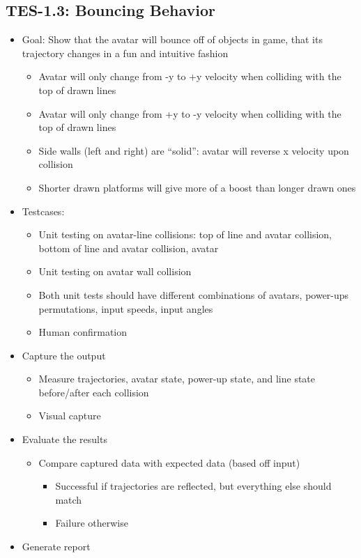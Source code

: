 \subsection{TES-1.3: Bouncing Behavior }
\label{bounce}
\begin{itemize}
\item Goal: Show that the avatar will bounce off of objects in game, that its trajectory changes in a fun and intuitive fashion 

\begin{itemize}
\item Avatar will only change from -y to +y velocity when colliding with the top of drawn lines 
\item Avatar will only change from +y to -y velocity when colliding with the top of drawn lines
\item Side walls (left and right) are \textquotedblleft{}solid\textquotedblright{}: avatar will reverse x velocity upon collision
\item Shorter drawn platforms will give more of a boost than longer drawn ones
\end{itemize}

\item Testcases: 
\begin{itemize}
\item Unit testing on avatar-line collisions: top of line and avatar collision, bottom of line and avatar collision, avatar 
\item Unit testing on avatar wall collision 
\item Both unit tests should have different combinations of avatars, power-ups permutations, input speeds, input angles
\item Human confirmation 
\end{itemize}

\item Capture the output 
\begin{itemize}
\item Measure trajectories, avatar state, power-up state, and line state before/after each collision 
\item Visual capture 
\end{itemize}

\item Evaluate the results
\begin{itemize}
\item Compare captured data with expected data (based off input)
\begin{itemize}
\item Successful if trajectories are reflected, but everything else should match
\item Failure otherwise
\end{itemize}
\end{itemize}
\item Generate report 


\end{itemize}
